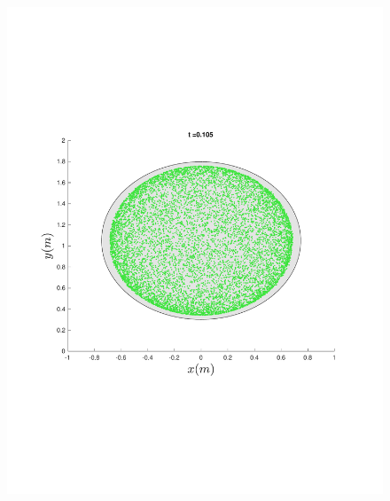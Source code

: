 \begin{figure}
{\begin{minipage}{0.5\textwidth}
\begin{minipage}[b]{0.5\textwidth}
        \includegraphics[width=\textwidth]{figures/method/FunnelSimOverlaid15funnel-1}
      \end{minipage}%
      \\
      \begin{minipage}[b]{0.5\textwidth}

\end{minipage}
\end{minipage}}
\end{figure}
